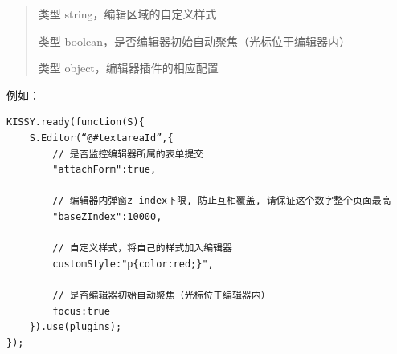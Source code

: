 \documentclass[letterpaper,10pt,english]{sphinxmanual}
\begin{document}
\begin{fulllineitems}
\begin{quote}
\begin{description}
\begin{itemize}
\begin{fulllineitems}
\end{fulllineitems}



\begin{fulllineitems}
\label{relatedproj/editorguide/usage:Editor.KISSY.Editor.config.customStyle}
类型 string，编辑区域的自定义样式

\end{fulllineitems}



\begin{fulllineitems}
\label{relatedproj/editorguide/usage:Editor.KISSY.Editor.config.focus}
类型 boolean，是否编辑器初始自动聚焦（光标位于编辑器内）

\end{fulllineitems}



\begin{fulllineitems}
\label{relatedproj/editorguide/usage:Editor.KISSY.Editor.config.pluginConfig}
类型 object，编辑器插件的相应配置

\end{fulllineitems}



\end{itemize}

\end{description}\end{quote}

\end{fulllineitems}


例如：

\begin{Verbatim}[commandchars=@\[\]]
KISSY.ready(function(S){
    S.Editor(“@#textareaId”,{
        // 是否监控编辑器所属的表单提交
        "attachForm":true,

        // 编辑器内弹窗z-index下限, 防止互相覆盖, 请保证这个数字整个页面最高
        "baseZIndex":10000,

        // 自定义样式，将自己的样式加入编辑器
        customStyle:"p{color:red;}",

        // 是否编辑器初始自动聚焦（光标位于编辑器内）
        focus:true
    }).use(plugins);
});
\end{Verbatim}
\end{document}
